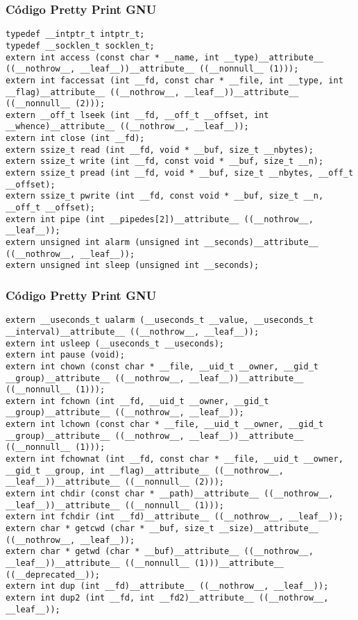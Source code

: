 \documentclass{beamer}
\begin{document}
\begin{frame}[fragile]
\frametitle{C\'odigo Pretty Print GNU}
\begin{verbatim}
typedef __intptr_t intptr_t;
typedef __socklen_t socklen_t;
extern int access (const char * __name, int __type)__attribute__ ((__nothrow__, __leaf__))__attribute__ ((__nonnull__ (1)));
extern int faccessat (int __fd, const char * __file, int __type, int __flag)__attribute__ ((__nothrow__, __leaf__))__attribute__ ((__nonnull__ (2)));
extern __off_t lseek (int __fd, __off_t __offset, int __whence)__attribute__ ((__nothrow__, __leaf__));
extern int close (int __fd);
extern ssize_t read (int __fd, void * __buf, size_t __nbytes);
extern ssize_t write (int __fd, const void * __buf, size_t __n);
extern ssize_t pread (int __fd, void * __buf, size_t __nbytes, __off_t __offset);
extern ssize_t pwrite (int __fd, const void * __buf, size_t __n, __off_t __offset);
extern int pipe (int __pipedes[2])__attribute__ ((__nothrow__, __leaf__));
extern unsigned int alarm (unsigned int __seconds)__attribute__ ((__nothrow__, __leaf__));
extern unsigned int sleep (unsigned int __seconds);
\end{verbatim}
\end{frame}
\begin{frame}[fragile]
\frametitle{C\'odigo Pretty Print GNU}
\begin{verbatim}
extern __useconds_t ualarm (__useconds_t __value, __useconds_t __interval)__attribute__ ((__nothrow__, __leaf__));
extern int usleep (__useconds_t __useconds);
extern int pause (void);
extern int chown (const char * __file, __uid_t __owner, __gid_t __group)__attribute__ ((__nothrow__, __leaf__))__attribute__ ((__nonnull__ (1)));
extern int fchown (int __fd, __uid_t __owner, __gid_t __group)__attribute__ ((__nothrow__, __leaf__));
extern int lchown (const char * __file, __uid_t __owner, __gid_t __group)__attribute__ ((__nothrow__, __leaf__))__attribute__ ((__nonnull__ (1)));
extern int fchownat (int __fd, const char * __file, __uid_t __owner, __gid_t __group, int __flag)__attribute__ ((__nothrow__, __leaf__))__attribute__ ((__nonnull__ (2)));
extern int chdir (const char * __path)__attribute__ ((__nothrow__, __leaf__))__attribute__ ((__nonnull__ (1)));
extern int fchdir (int __fd)__attribute__ ((__nothrow__, __leaf__));
extern char * getcwd (char * __buf, size_t __size)__attribute__ ((__nothrow__, __leaf__));
extern char * getwd (char * __buf)__attribute__ ((__nothrow__, __leaf__))__attribute__ ((__nonnull__ (1)))__attribute__ ((__deprecated__));
extern int dup (int __fd)__attribute__ ((__nothrow__, __leaf__));
extern int dup2 (int __fd, int __fd2)__attribute__ ((__nothrow__, __leaf__));
\end{verbatim}
\end{frame}
\end{document}
